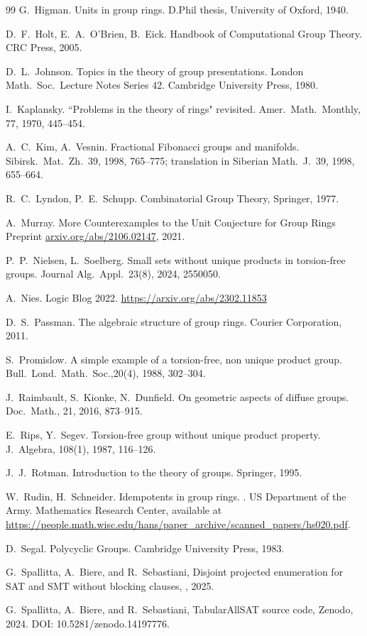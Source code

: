 \documentclass[11pt]{amsart}
\theoremstyle{mythm}
\theoremstyle{mydef}
\theoremstyle{myrem}
\numberwithin{equation}{section}
\begin{document}
{\begin{thebibliography}{99}
G.\ Higman.
Units in group rings.
D.Phil thesis, University of Oxford, 1940.

  D.\ F.\ Holt, E.\ A.\ O'Brien, B.\ Eick.
  Handbook of Computational Group Theory.
  CRC Press, 2005.


  D.\ L.\ Johnson.
  Topics in the theory of group presentations. London Math.\ Soc.\ Lecture Notes Series 42.
  Cambridge University Press, 1980.
  

I.\ Kaplansky. 
``Problems in the theory of rings" revisited. 
Amer.\ Math.\ Monthly, 77, 1970, 445--454.

  A.\  C.\ Kim, A.\ Vesnin. Fractional Fibonacci groups and manifolds.
 Sibirsk.\ Mat.\ Zh.\ 39, 1998, 765--775; translation in Siberian Math.\ J.\ 39, 1998, 655--664.


  R.\ C.\ Lyndon, P.\ E.\ Schupp.
 Combinatorial Group Theory, Springer, 1977.
 
  A.\ Murray.
  More Counterexamples to the Unit Conjecture for Group Rings
  Preprint \url{arxiv.org/abs/2106.02147}, 2021.

P.\ P.\ Nielsen, L.\ Soelberg.  
Small sets without unique products in torsion-free groups.
Journal Alg.\ Appl.\ 23(8), 2024, 2550050.
  
A.\ Nies. Logic Blog 2022. \url{https://arxiv.org/abs/2302.11853}
  
D.\ S.\ Passman. The algebraic structure of group rings. Courier Corporation, 2011.
  
S.\ Promislow. 
A simple example of a torsion-free, non unique product group.
Bull.\ Lond.\ Math.\ Soc.,20(4), 1988, 302–304.

J.\ Raimbault, S.\ Kionke, N.\ Dunfield. 
On geometric aspects of diffuse groups.
Doc.\ Math., 21, 2016, 873--915.

E.\ Rips, Y.\ Segev. 
Torsion-free group without unique product property. 
J.\ Algebra, 108(1), 1987, 116--126.


J.\ J.\ Rotman. Introduction to the theory of groups. Springer, 1995.  


W.~Rudin, H.~Schneider.
\newblock Idempotents in group rings.
.
\newblock US Department of the Army. Mathematics Research Center,
available at
\url{https://people.math.wisc.edu/hans/paper_archive/scanned_papers/hs020.pdf}.


D.\ Segal. Polycyclic Groups. Cambridge University Press, 1983.

G.~Spallitta, A.~Biere, and R.~Sebastiani,
\newblock Disjoint projected enumeration for SAT and SMT without blocking clauses,
, 2025.

G.~Spallitta, A.~Biere, and R.~Sebastiani,
\newblock TabularAllSAT source code,
\newblock Zenodo, 2024.
\newblock DOI: 10.5281/zenodo.14197776.


\end{thebibliography}

}


	
\end{document}
